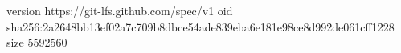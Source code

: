 version https://git-lfs.github.com/spec/v1
oid sha256:2a2648bb13ef02a7c709b8dbce54ade839eba6e181e98ce8d992de061cff1228
size 5592560
